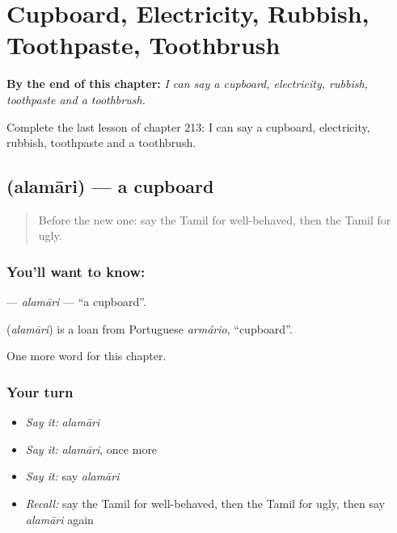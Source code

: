 
\chapter{Cupboard, Electricity, Rubbish, Toothpaste, Toothbrush}
\label{ch:ta-cupboard-electricity-rubbish-toothpaste-toothbrush}

\begin{chapteropening}
\textbf{By the end of this chapter:} \emph{I can say a cupboard, electricity, rubbish, toothpaste and a toothbrush.}

Complete the last lesson of chapter 213: I can say a cupboard, electricity, rubbish, toothpaste and a toothbrush.
\end{chapteropening}

\section[\texorpdfstring{\ta{அலமாரி} (alamāri)}{அலமாரி (alamāri)}]{ (alamāri) — a cupboard}

\label{lesson:TA-C213-alamari}



\begin{quote}
Before the new one: say the Tamil for well-behaved, then the Tamil for ugly.
\end{quote}

\subsection*{You'll want to know: }
\textbf{} — \emph{alamāri} — \textquotedblleft{}a cupboard\textquotedblright{}.

\begin{cousinweb}
\textbf{} (\emph{alamāri}) is a loan from Portuguese \emph{armário}, \textquotedblleft{}cupboard\textquotedblright{}.
\end{cousinweb}

\begin{grammarlens}[title={What you've built}]
One more word for this chapter.
\end{grammarlens}

\subsection*{Your turn}
\begin{itemize}
\raggedright
  \item \emph{Say it:} \emph{alamāri}
  \item \emph{Say it:} \emph{alamāri}, once more
  \item \emph{Say it:} say \emph{alamāri}
  \item \emph{Recall:} say the Tamil for well-behaved, then the Tamil for ugly, then say \emph{alamāri} again
\end{itemize}

